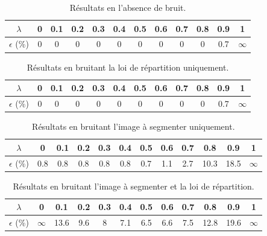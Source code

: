 \documentclass{article}
\begin{document}
\begin{table}[h!]
\begin{center}
  \begin{tabular}{|c|c|c|c|c|c|c|c|c|c|c|c|}
		\hline
		$\lambda$ & 0 & 0.1& 0.2 & 0.3 & 0.4 & 0.5 & 0.6 & 0.7 & 0.8 & 0.9 & 1\\
		\hline
		$\epsilon$ (\%) & 0 & 0 & 0 & 0 & 0 & 0 & 0 & 0 & 0 & 0.7 & $\infty$\\
		\hline
\end{tabular}
\end{center}
\caption{Résultats en l'absence de bruit.}
\end{table}

\begin{table}[h!]
\begin{center}
  \begin{tabular}{|c|c|c|c|c|c|c|c|c|c|c|c|}
		\hline
		$\lambda$ & 0 & 0.1& 0.2 & 0.3 & 0.4 & 0.5 & 0.6 & 0.7 & 0.8 & 0.9 & 1\\
		\hline
		$\epsilon$ (\%) & 0 & 0 & 0 & 0 & 0 & 0 & 0 & 0 & 0 & 0.7 & $\infty$\\
		\hline
\end{tabular}
\end{center}
\caption{Résultats en bruitant la loi de répartition uniquement.}
\end{table}

\begin{table}[h!]
\begin{center}
  \begin{tabular}{|c|c|c|c|c|c|c|c|c|c|c|c|}
		\hline
		$\lambda$ & 0 & 0.1& 0.2 & 0.3 & 0.4 & 0.5 & 0.6 & 0.7 & 0.8 & 0.9 & 1\\
		\hline
        $\epsilon$ (\%) & 0.8 & 0.8 & 0.8 & 0.8 & 0.8 & 0.7 & 1.1 & 2.7 & 10.3 & 18.5 & $\infty$\\
		\hline
\end{tabular}
\end{center}
\caption{Résultats en bruitant l'image à segmenter uniquement.}
\end{table}

\begin{table}[h!]
\begin{center}
  \begin{tabular}{|c|c|c|c|c|c|c|c|c|c|c|c|}
		\hline
		$\lambda$ & 0 & 0.1& 0.2 & 0.3 & 0.4 & 0.5 & 0.6 & 0.7 & 0.8 & 0.9 & 1\\
		\hline
		$\epsilon$ (\%) & $\infty$ & 13.6 & 9.6 & 8 & 7.1 & 6.5 & 6.6 & 7.5 & 12.8 & 19.6 & $\infty$\\
		\hline
\end{tabular}
\end{center}
\caption{Résultats en bruitant l'image à segmenter et la loi de répartition.}
\end{table}
\end{document}
